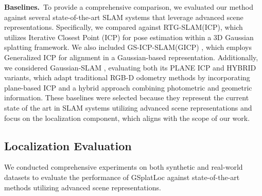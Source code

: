 \documentclass[twocolumn]{article}
\begin{document}
\textbf{Baselines.}~To provide a comprehensive comparison, we evaluated
our method against several state-of-the-art SLAM systems that leverage
advanced scene representations. Specifically, we compared against
RTG-SLAM(ICP)\autocite{pengRTGSLAMRealtime3D2024}, which utilizes
Iterative Closest Point (ICP) for pose estimation within a 3D Gaussian
splatting framework. We also included GS-ICP-SLAM(GICP)
\autocite{haRGBDGSICPSLAM2024}, which employs Generalized ICP for
alignment in a Gaussian-based representation. Additionally, we
considered Gaussian-SLAM
\autocite{yugayGaussianSLAMPhotorealisticDense2024}, evaluating both its
PLANE ICP and HYBRID variants, which adapt traditional RGB-D odometry
methods by incorporating plane-based ICP and a hybrid approach combining
photometric and geometric information. These baselines were selected
because they represent the current state of the art in SLAM systems
utilizing advanced scene representations and focus on the localization
component, which aligns with the scope of our work.

\subsection{Localization Evaluation}\label{localization-evaluation}

We conducted comprehensive experiments on both synthetic and real-world
datasets to evaluate the performance of GSplatLoc against
state-of-the-art methods utilizing advanced scene representations.
\end{document}
